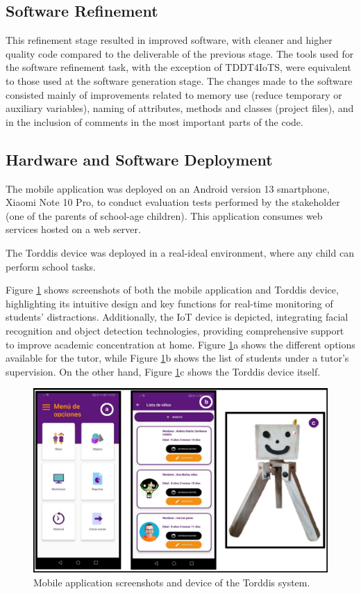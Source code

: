 \documentclass[a4paper,fleqn]{cas-sc}
\begin{document}
		\subsection{Software Refinement}
			This refinement stage resulted in improved software, with cleaner and higher quality code compared to the deliverable of the previous stage. The tools used for the software refinement task, with the exception of TDDT4IoTS, were equivalent to those used at the software generation stage. The changes made to the software consisted mainly of improvements related to memory use (reduce temporary or auxiliary variables), naming of attributes, methods and classes (project files), and in the inclusion of comments in the most important parts of the code.
		
		\subsection{Hardware and Software Deployment}
			The mobile application was deployed on an Android version 13 smartphone, Xiaomi Note 10 Pro, to conduct evaluation tests performed by the stakeholder (one of the parents of school-age children). This application consumes web services hosted on a web server.
		
			The Torddis device was deployed in a real-ideal environment, where any child can perform school tasks.
			
			Figure \ref{fig:Torddis} shows screenshots of both the mobile application and Torddis device, highlighting its intuitive design and key functions for real-time monitoring of students' distractions. Additionally, the IoT device is depicted, integrating facial recognition and object detection technologies, providing comprehensive support to improve academic concentration at home. Figure \ref{fig:Torddis}a shows the different options available for the tutor, while Figure \ref{fig:Torddis}b shows the list of students under a tutor's supervision. On the other hand, Figure \ref{fig:Torddis}c shows the Torddis device itself.
			
			\begin{figure}[hbt!]
				\centering
				\includegraphics[width=\linewidth]{figs/Figure_9}
				\caption{Mobile application screenshots and device of the Torddis system.\label{fig:Torddis}} 
			\end{figure}
			
\end{document}
